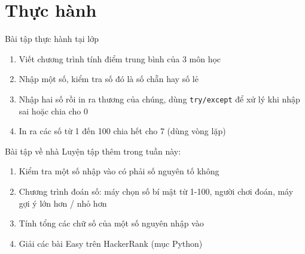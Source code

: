 \documentclass[11pt]{beamer}
\begin{document}
\section{Thực hành}

\begin{frame}{Bài tập thực hành tại lớp}
\begin{enumerate}
  \item Viết chương trình tính điểm trung bình của 3 môn học
  \item Nhập một số, kiểm tra số đó là số chẵn hay số lẻ
  \item Nhập hai số rồi in ra thương của chúng, dùng \texttt{try/except} để xử lý khi nhập sai hoặc chia cho 0
  \item In ra các số từ 1 đến 100 chia hết cho 7 (dùng vòng lặp)
\end{enumerate}
\end{frame}

\begin{frame}{Bài tập về nhà}
Luyện tập thêm trong tuần này:
\begin{enumerate}
  \item Kiểm tra một số nhập vào có phải số nguyên tố không
  \item Chương trình đoán số: máy chọn số bí mật từ 1-100, người chơi đoán, máy gợi ý lớn hơn / nhỏ hơn
  \item Tính tổng các chữ số của một số nguyên nhập vào
  \item Giải các bài Easy trên HackerRank (mục Python)
\end{enumerate}
\end{frame}
\end{document}
